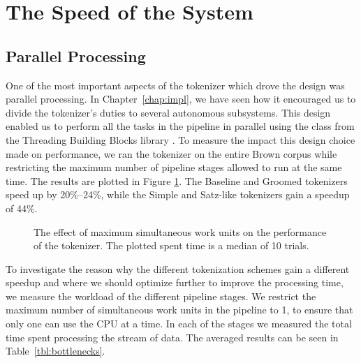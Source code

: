 \section{The Speed of the System}
\label{sec:eval-spd}

\subsection{Parallel Processing}
\label{ssec:eval-spd-parallel}

One of the most important aspects of the tokenizer which drove the design was
parallel processing. In Chapter~\ref{chap:impl}, we have seen how it encouraged
us to divide the tokenizer's duties to several autonomous subsystems. This
design enabled us to perform all the tasks in the pipeline in parallel using
the  class from the Threading Building Blocks library
\cite{web-tbb}. To measure the impact this design choice made on performance,
we ran the tokenizer on the entire Brown corpus while restricting the maximum
number of pipeline stages allowed to run at the same time. The results are
plotted in Figure \ref{fig:plot-work-units}. The Baseline and Groomed
tokenizers speed up by 20\%--24\%, while the Simple and Satz-like tokenizers
gain a speedup of 44\%.

\begin{figure}
  \begin{center}
    
    \caption{The effect of maximum simultaneous work units on the performance of
             the tokenizer. The plotted spent time is a median of 10 trials.}
    \label{fig:plot-work-units}
  \end{center}
\end{figure}

To investigate the reason why the different tokenization schemes gain a
different speedup and where we should optimize further to improve the
processing time, we measure the workload of the different pipeline stages. We
restrict the maximum number of simultaneous work units in the pipeline to 1, to
ensure that only one can use the CPU at a time. In each of the stages we
measured the total time spent processing the stream of data. The averaged
results can be seen in Table~\ref{tbl:bottlenecks}.

